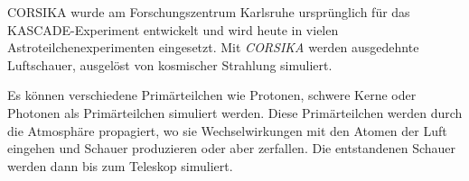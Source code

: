 CORSIKA wurde am Forschungszentrum Karlsruhe ursprünglich für das KASCADE-Experiment entwickelt und wird heute in vielen Astroteilchenexperimenten eingesetzt.
Mit \textit{CORSIKA} werden ausgedehnte Luftschauer, ausgelöst von kosmischer Strahlung simuliert.

Es können verschiedene Primärteilchen wie Protonen, schwere Kerne oder Photonen als Primärteilchen simuliert werden.
Diese Primärteilchen werden durch die Atmosphäre propagiert, wo sie Wechselwirkungen mit den Atomen der Luft eingehen und Schauer produzieren oder aber zerfallen.
Die entstandenen Schauer werden dann bis zum Teleskop simuliert.



